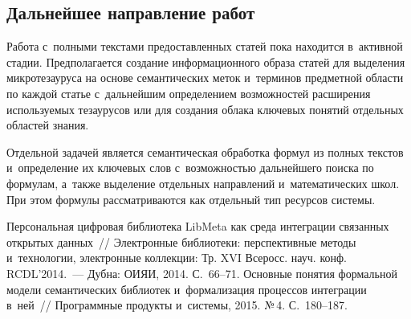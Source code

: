 \begin{multicols}{2}
\vspace*{-10pt}
     
\section{Дальнейшее направление работ}

\vspace*{-3pt}

Работа с~полными текстами предоставленных статей пока находится 
в~активной стадии. Предполагается создание информационного образа 
статей для выделения мик\-ро\-те\-зау\-ру\-са на основе семантических меток 
и~терминов предметной области по каж\-дой статье с~дальнейшим 
определением возможностей расширения используемых тезаурусов или для 
создания облака ключевых понятий отдельных областей знания. 

Отдельной 
задачей является семантическая обработка формул из полных текстов 
и~определение их ключевых слов с~воз\-мож\-ностью дальнейшего поиска по 
формулам, а~также выделение отдельных направлений и~математических школ. При 
этом формулы рас\-смат\-ри\-ва\-ют\-ся как отдельный тип ресурсов сис\-темы.

\vspace*{-6pt}
     
{\small\frenchspacing
 {%
 \begin{thebibliography}{9}
 
 \vspace*{-2pt}

 Персональная цифровая библиотека LibMeta как 
среда интеграции связанных открытых данных~// Электронные библиотеки: 
перспективные методы и~технологии, электронные коллекции: Тр. XVI Всеросс. науч. 
конф. RCDL'2014.~--- Дубна: ОИЯИ, 2014. С.~66--71.
 Основные понятия формальной 
модели семантических биб\-лио\-тек и~формализация процессов интеграции в~ней~// 
Программные продукты и~сис\-те\-мы, 2015. №\,4. С.~180--187.


\end{thebibliography}}}
\end{multicols}
